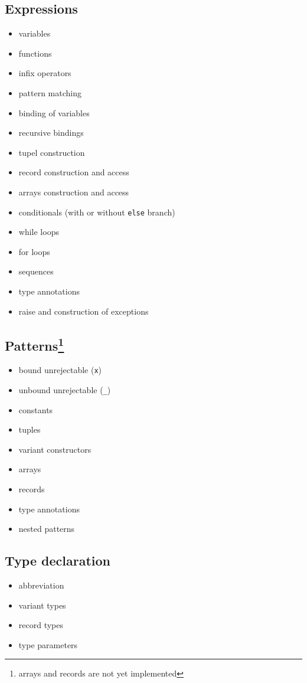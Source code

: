 \documentclass{article}
\begin{document}
\subsection{Expressions}

\begin{multicols}{2}
\begin{itemize}
  \item variables
  \item functions
  \item infix operators
  \item pattern matching
  \item binding of variables
  \item recursive bindings
  \item tupel construction
  \item record construction and access
  \item arrays construction and access
  \item conditionals (with or without \texttt{else} branch)
  \item while loops
  \item for loops
  \item sequences
  \item type annotations
  \item raise and construction of exceptions
\end{itemize}
\end{multicols}

\subsection{Patterns\footnote{arrays and records are not yet implemented}}

\begin{multicols}{2}
\begin{itemize}
  \item bound unrejectable (\texttt{x}) 
  \item unbound unrejectable (\texttt{\_})
  \item constants
  \item tuples
  \item variant constructors
  \item arrays
  \item records
  \item type annotations
  \item nested patterns
\end{itemize}
\end{multicols}

\subsection{Type declaration}

\begin{multicols}{2}
\begin{itemize}
  \item abbreviation
  \item variant types
  \item record types
  \item type parameters
\end{itemize}
\end{multicols}
\end{document}
